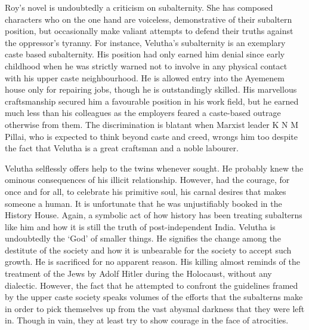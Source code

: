 Roy’s novel is undoubtedly a criticism on subalternity. She has composed characters who on the one hand are voiceless, demonstrative of their subaltern position, but occasionally make valiant attempts to defend their truths against the oppressor’s tyranny. For instance, Velutha’s subalternity is an exemplary caste based subalternity. His position had only earned him denial since early childhood when he was strictly warned not to involve in any physical contact with his upper caste neighbourhood. He is allowed entry into the Ayemenem house only for repairing jobs, though he is outstandingly skilled. His marvellous craftsmanship secured him a favourable position in his work field, but he earned much less than his colleagues as the employers feared a caste-based outrage otherwise from them. The discrimination is blatant when Marxist leader K N M Pillai, who is expected to think beyond caste and creed, wrongs him too despite the fact that Velutha is a great craftsman and a noble labourer.

Velutha selflessly offers help to the twins whenever sought. He probably knew the ominous consequences of his illicit relationship. However, had the courage, for once and for all, to celebrate his primitive soul, his carnal desires that makes someone a human. It is unfortunate that he was unjustifiably booked in the History House. Again, a symbolic act of how history has been treating subalterns like him and how it is still the truth of post-independent India. Velutha is undoubtedly the ‘God’ of smaller things. He signifies the change among the destitute of the society and how it is unbearable for the society to accept such growth. He is sacrificed for no apparent reason. His killing almost reminds of the treatment of the Jews by Adolf Hitler during the Holocaust, without any dialectic. However, the fact that he attempted to confront the guidelines framed by the upper caste society speaks volumes of the efforts that the subalterns make in order to pick themselves up from the vast abysmal darkness that they were left in. Though in vain, they at least try to show courage in the face of atrocities.

